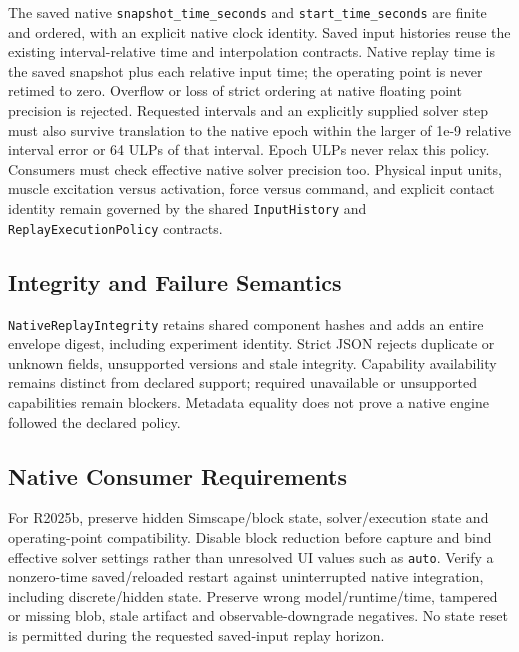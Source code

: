 \documentclass[
  american,
]{article}
\begin{document}
The saved native \texttt{snapshot\_time\_seconds} and
\texttt{start\_time\_seconds} are finite and ordered, with an explicit
native clock identity. Saved input histories reuse the existing
interval-relative time and interpolation contracts. Native replay time
is the saved snapshot plus each relative input time; the operating point
is never retimed to zero. Overflow or loss of strict ordering at native
floating point precision is rejected. Requested intervals and an
explicitly supplied solver step must also survive translation to the
native epoch within the larger of 1e-9 relative interval error or 64
ULPs of that interval. Epoch ULPs never relax this policy. Consumers
must check effective native solver precision too. Physical input units,
muscle excitation versus activation, force versus command, and explicit
contact identity remain governed by the shared \texttt{InputHistory} and
\texttt{ReplayExecutionPolicy} contracts.

\subsection{Integrity and Failure
Semantics}\label{integrity-and-failure-semantics}

\texttt{NativeReplayIntegrity} retains shared component hashes and adds
an entire envelope digest, including experiment identity. Strict JSON
rejects duplicate or unknown fields, unsupported versions and stale
integrity. Capability availability remains distinct from declared
support; required unavailable or unsupported capabilities remain
blockers. Metadata equality does not prove a native engine followed the
declared policy.

\subsection{Native Consumer
Requirements}\label{native-consumer-requirements}

For R2025b, preserve hidden Simscape/block state, solver/execution state
and operating-point compatibility. Disable block reduction before
capture and bind effective solver settings rather than unresolved UI
values such as \texttt{auto}. Verify a nonzero-time saved/reloaded
restart against uninterrupted native integration, including
discrete/hidden state. Preserve wrong model/runtime/time, tampered or
missing blob, stale artifact and observable-downgrade negatives. No
state reset is permitted during the requested saved-input replay
horizon.
\end{document}
